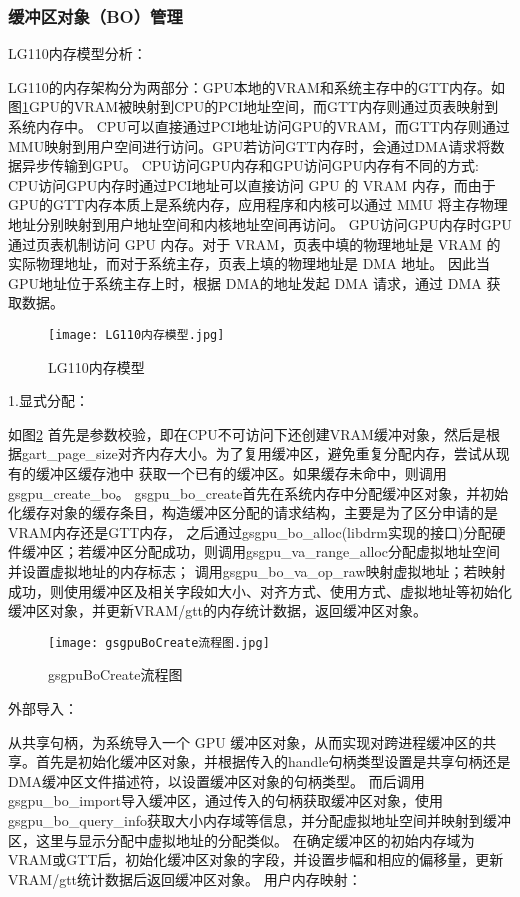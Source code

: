 \subsubsection{缓冲区对象（BO）管理}

LG110内存模型分析：

LG110的内存架构分为两部分：GPU本地的VRAM和系统主存中的GTT内存。如图\ref{fig:LG110内存模型}GPU的VRAM被映射到CPU的PCI地址空间，而GTT内存则通过页表映射到系统内存中。
CPU可以直接通过PCI地址访问GPU的VRAM，而GTT内存则通过MMU映射到用户空间进行访问。GPU若访问GTT内存时，会通过DMA请求将数据异步传输到GPU。
CPU访问GPU内存和GPU访问GPU内存有不同的方式:
CPU访问GPU内存时通过PCI地址可以直接访问 GPU 的 VRAM 内存，而由于GPU的GTT内存本质上是系统内存，应用程序和内核可以通过 MMU 将主存物理地址分别映射到用户地址空间和内核地址空间再访问。
GPU访问GPU内存时GPU 通过页表机制访问 GPU 内存。对于 VRAM，页表中填的物理地址是 VRAM 的实际物理地址，而对于系统主存，页表上填的物理地址是 DMA 地址。
因此当GPU地址位于系统主存上时，根据 DMA的地址发起 DMA 请求，通过 DMA 获取数据。

\begin{figure}[h]
  \centering
  \texttt{[image: LG110内存模型.jpg]}
  \caption{LG110内存模型}
  \label{fig:LG110内存模型}
\end{figure}

1.显式分配：

如图\ref{fig:gsgpuBoCreate流程图}
首先是参数校验，即在CPU不可访问下还创建VRAM缓冲对象，然后是根据gart\_page\_size对齐内存大小。为了复用缓冲区，避免重复分配内存，尝试从现有的缓冲区缓存池中
获取一个已有的缓冲区。如果缓存未命中，则调用gsgpu\_create\_bo。
gsgpu\_bo\_create首先在系统内存中分配缓冲区对象，并初始化缓存对象的缓存条目，构造缓冲区分配的请求结构，主要是为了区分申请的是VRAM内存还是GTT内存，
之后通过gsgpu\_bo\_alloc(libdrm实现的接口)分配硬件缓冲区；若缓冲区分配成功，则调用gsgpu\_va\_range\_alloc分配虚拟地址空间并设置虚拟地址的内存标志；
调用gsgpu\_bo\_va\_op\_raw映射虚拟地址；若映射成功，则使用缓冲区及相关字段如大小、对齐方式、使用方式、虚拟地址等初始化缓冲区对象，并更新VRAM/gtt的内存统计数据，返回缓冲区对象。
\begin{figure}[h]
  \centering
  \texttt{[image: gsgpuBoCreate流程图.jpg]}
  \caption{gsgpuBoCreate流程图}
  \label{fig:gsgpuBoCreate流程图}
\end{figure}

外部导入：

从共享句柄，为系统导入一个 GPU 缓冲区对象，从而实现对跨进程缓冲区的共享。首先是初始化缓冲区对象，并根据传入的handle句柄类型设置是共享句柄还是DMA缓冲区文件描述符，以设置缓冲区对象的句柄类型。
而后调用gsgpu\_bo\_import导入缓冲区，通过传入的句柄获取缓冲区对象，使用gsgpu\_bo\_query\_info获取大小内存域等信息，并分配虚拟地址空间并映射到缓冲区，这里与显示分配中虚拟地址的分配类似。
在确定缓冲区的初始内存域为VRAM或GTT后，初始化缓冲区对象的字段，并设置步幅和相应的偏移量，更新VRAM/gtt统计数据后返回缓冲区对象。
用户内存映射：

